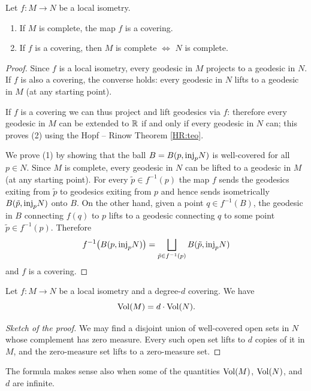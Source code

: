 \begin{prop} \label{local:isometry:prop}
Let $f\colon M \to N$ be a local isometry.
\begin{enumerate}
\item If $M$ is complete, the map $f$ is a covering.
\item If $f$ is a covering, then $M$ is complete $\Longleftrightarrow$ $N$ is complete.
\end{enumerate}
\end{prop}
\begin{proof}
Since $f$ is a local isometry, every geodesic in $M$ projects to a geodesic in $N$. If $f$ is also a covering, the converse holds: every geodesic in $N$ lifts to a geodesic in $M$ (at any starting point). 

If $f$ is a covering we can thus project and lift geodesics via $f$: therefore every geodesic in $M$ can be extended to $\mathbb{R}$ if and only if every geodesic in $N$ can; this proves (2) using the Hopf -- Rinow Theorem \ref{HR:teo}.

We prove (1) by showing that the ball $B=B(p,{\rm inj}_pN)$ is well-covered for all $p\in N$. Since $M$ is complete, every geodesic in $N$ can be lifted to a geodesic in $M$ (at any starting point).  For every $\tilde p \in f^{-1}(p)$ the map $f$ sends the geodesics exiting from $\tilde p$ to geodesics exiting from $p$ and hence sends isometrically $B(\tilde p, {\rm inj}_p N)$ onto $B$. On the other hand, given a point $q\in f^{-1}(B)$, the geodesic in $B$ connecting $f(q)$ to $p$ lifts to a geodesic connecting $q$ to some point $\tilde p \in f^{-1}(p)$. Therefore 
$$f^{-1}\big(B(p,{\rm inj}_p N)\big) = \bigsqcup_{\tilde p \in f^{-1}(p)} B(\tilde p, {\rm inj}_p N)$$
and $f$ is a covering.
\end{proof}

\begin{prop} \label{volume:covering:prop}
Let $f\colon M \to N$ be a local isometry and a degree-$d$ covering. We have
$${\rm Vol}(M) = d \cdot {\rm Vol} (N).$$
\end{prop}
\begin{proof}[Sketch of the proof]
We may find a disjoint union of well-covered open sets in $N$ whose complement has zero measure. Every such open set lifts to $d$ copies of it in $M$, and the zero-measure set lifts to a zero-measure set.
\end{proof}

The formula makes sense also when some of the quantities ${\rm Vol}(M)$, ${\rm Vol}(N)$, and $d$ are infinite.

